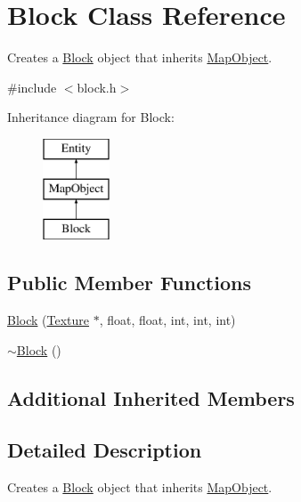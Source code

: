 \hypertarget{class_block}{\section{Block Class Reference}
\label{class_block}
}


Creates a \hyperlink{class_block}{Block} object that inherits \hyperlink{class_map_object}{Map\+Object}.  




{\ttfamily \#include $<$block.\+h$>$}

Inheritance diagram for Block\+:\begin{figure}[H]
\begin{center}
\leavevmode
\includegraphics[height=3.000000cm]{class_block}
\end{center}
\end{figure}
\subsection*{Public Member Functions}
\begin{DoxyCompactItemize}
\item 
\hyperlink{class_block_ae82bbded382f61248fe4ab7f198f66f7}{Block} (\hyperlink{class_texture}{Texture} $\ast$, float, float, int, int, int)
\item 
\hyperlink{class_block_a19d1bd0e1cef6a865ed2745a2e648405}{$\sim$\+Block} ()
\end{DoxyCompactItemize}
\subsection*{Additional Inherited Members}


\subsection{Detailed Description}
Creates a \hyperlink{class_block}{Block} object that inherits \hyperlink{class_map_object}{Map\+Object}. 

